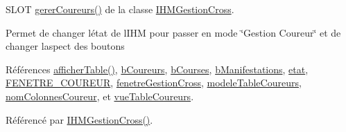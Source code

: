 S\+L\+OT \hyperlink{class_i_h_m_gestion_cross_ad46a2295500cf98dbc18f862f6020103}{gerer\+Coureurs()} de la classe \hyperlink{class_i_h_m_gestion_cross}{I\+H\+M\+Gestion\+Cross}. 

Permet de changer l\textquotesingle{}état de l\textquotesingle{}I\+HM pour passer en mode \char`\"{}\+Gestion Coureur\char`\"{} et de changer l\textquotesingle{}aspect des boutons 

Références \hyperlink{class_i_h_m_gestion_cross_ae1510779a1efa3defecb517467e84f91}{afficher\+Table()}, \hyperlink{class_i_h_m_gestion_cross_ac2819198bae00b7e0f23e8bc491b4cbb}{b\+Coureurs}, \hyperlink{class_i_h_m_gestion_cross_a0df377aec07ada51a115cc458854c966}{b\+Courses}, \hyperlink{class_i_h_m_gestion_cross_a540b4525e546b6d61988245ae53768ce}{b\+Manifestations}, \hyperlink{class_i_h_m_gestion_cross_a5da4390d71dbd5d05cff339f93c7c85a}{etat}, \hyperlink{ihmgestioncross_8h_ac2f4c2b58b7adbfe81ec7b9ee1293213}{F\+E\+N\+E\+T\+R\+E\+\_\+\+C\+O\+U\+R\+E\+UR}, \hyperlink{class_i_h_m_gestion_cross_a2ae4807c25f35813507ff0a2abb2ffb3}{fenetre\+Gestion\+Cross}, \hyperlink{class_i_h_m_gestion_cross_ad9560c4804694dbbf969de5f6f56eb30}{modele\+Table\+Coureurs}, \hyperlink{class_i_h_m_gestion_cross_ab95ce87fd2f9427023040cc8d0077681}{nom\+Colonnes\+Coureur}, et \hyperlink{class_i_h_m_gestion_cross_a4a0ba98c5b671a38d67942254d2329db}{vue\+Table\+Coureurs}.



Référencé par \hyperlink{class_i_h_m_gestion_cross_a2c62fd83326a87456a403f46acc408c8}{I\+H\+M\+Gestion\+Cross()}.


